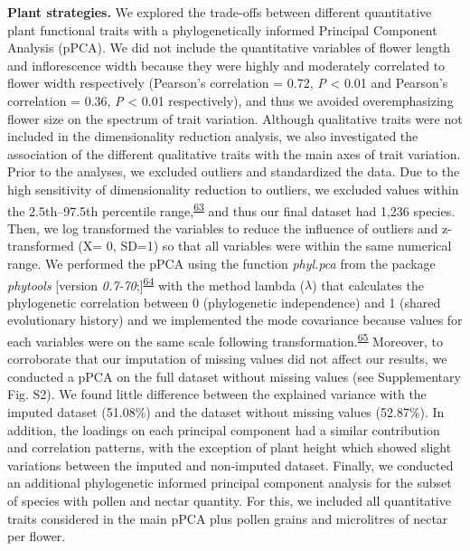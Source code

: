 \documentclass[
  12pt,
  a4paper,
]{article}
\begin{document}
\textbf{Plant strategies.} We explored the trade-offs between different quantitative plant functional traits with a phylogenetically informed Principal Component Analysis (pPCA). We did not include the quantitative variables of flower length and inflorescence width because they were highly and moderately correlated to flower width respectively (Pearson's correlation = 0.72, \emph{P} \textless{} 0.01 and Pearson's correlation = 0.36, \emph{P} \textless{} 0.01 respectively), and thus we avoided overemphasizing flower size on the spectrum of trait variation. Although qualitative traits were not included in the dimensionality reduction analysis, we also investigated the association of the different qualitative traits with the main axes of trait variation. Prior to the analyses, we excluded outliers and standardized the data. Due to the high sensitivity of dimensionality reduction to outliers, we excluded values within the 2.5th--97.5th percentile range,\textsuperscript{\protect\hyperlink{ref-legendre2012}{63}} and thus our final dataset had 1,236 species. Then, we log transformed the variables to reduce the influence of outliers and z-transformed (X= 0, SD=1) so that all variables were within the same numerical range. We performed the pPCA using the function \emph{phyl.pca} from the package \emph{phytools} {[}version \emph{0.7-70};{]}\textsuperscript{\protect\hyperlink{ref-revell2012}{64}} with the method lambda (\(\lambda\)) that calculates the phylogenetic correlation between 0 (phylogenetic independence) and 1 (shared evolutionary history) and we implemented the mode covariance because values for each variables were on the same scale following transformation.\textsuperscript{\protect\hyperlink{ref-abdi2010}{65}} Moreover, to corroborate that our imputation of missing values did not affect our results, we conducted a pPCA on the full dataset without missing values (see Supplementary Fig. S2). We found little difference between the explained variance with the imputed dataset (51.08\%) and the dataset without missing values (52.87\%). In addition, the loadings on each principal component had a similar contribution and correlation patterns, with the exception of plant height which showed slight variations between the imputed and non-imputed dataset. Finally, we conducted an additional phylogenetic informed principal component analysis for the subset of species with pollen and nectar quantity. For this, we included all quantitative traits considered in the main pPCA plus pollen grains and microlitres of nectar per flower.
\end{document}
